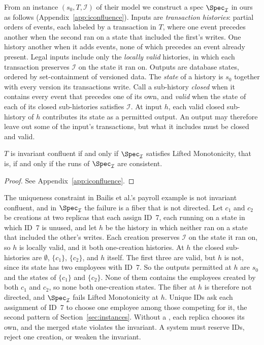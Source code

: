 From an instance $(s_0,T,\mathcal I)$ of their model we construct a
spec $\Spec_{\mathcal I}$ in ours as follows (Appendix~\ref{app:iconfluence}).
Inputs are \emph{transaction histories}: partial orders of events, each
labeled by a transaction in $T$, where one event precedes another when the
second ran on a state that included the first's writes.  One history \inrel
another when it adds events, none of which precedes an event already present.
Legal inputs include only the \emph{locally valid} histories, in which each
transaction preserves $\mathcal I$ on the state it ran on.  Outputs are
database states, ordered by set-containment of versioned data.  The
\emph{state} of a history is $s_0$ together with every version its
transactions write.  Call a sub-history \emph{closed} when it contains every
event that precedes one of its own, and \emph{valid} when the state of each of
its closed sub-histories satisfies $\mathcal I$.  At input $h$, each valid
closed sub-history of $h$ contributes its state as a permitted output.  An
output may therefore leave out some of the input's transactions, but what it
includes must be closed and valid.

\begin{proposition}
\label{prop:iconfluence-lm}
$T$ is invariant confluent if and only if $\Spec_{\mathcal I}$ satisfies Lifted
Monotonicity, that is, if and only if the runs of $\Spec_{\mathcal I}$ are consistent.
\end{proposition}

\begin{proof}
See Appendix~\ref{app:iconfluence}.
\end{proof}

The uniqueness constraint in Bailis et al.'s payroll example is not invariant
confluent, and in $\Spec_{\mathcal I}$ the failure is a fiber that is not
directed.  Let $c_1$ and $c_2$ be creations at two replicas that each assign
ID~7, each running on a state in which ID~7 is unused, and let $h$ be the
history in which neither ran on a state that included the other's writes.
Each creation preserves $\mathcal I$ on the state it ran on, so $h$ is locally
valid, and it \inrel both one-creation histories.  At $h$ the closed
sub-histories are $\emptyset$, $\{c_1\}$, $\{c_2\}$, and $h$ itself.  The first
three are valid, but $h$ is not, since its state has two employees with ID~7.
So the outputs permitted at $h$ are $s_0$ and the states of $\{c_1\}$ and
$\{c_2\}$.  None of them contains the employees created by both $c_1$ and
$c_2$, so none \outrel both one-creation states.  The fiber at $h$ is therefore
not directed, and $\Spec_{\mathcal I}$ fails Lifted Monotonicity at $h$.  Unique IDs
ask each assignment of ID~7 to choose one employee among those competing for
it, the second pattern of Section~\ref{sec:instances}.  Without a
\commitment, each replica chooses its own, and the merged state violates the
invariant.  A
system must reserve IDs, reject one creation, or weaken the invariant.

